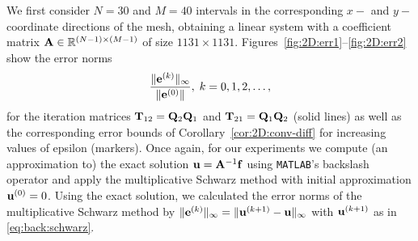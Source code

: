 We first consider $N = 30$ and $M = 40$ intervals in the corresponding $x-$ and
$y-$coordinate directions of the mesh, obtaining a linear system with a coefficient matrix  $\mathbf{A}\in\mathbb{R}^{(N-1)\times(M-1)}$ of size $1131 \times 1131$. Figures~\ref{fig:2D:err1}--\ref{fig:2D:err2} show the error norms
\[
\frac{\|\mathbf{e}^{(k)}\|_\infty}{\|\mathbf{e}^{(0)}\| },\;k=0,1,2,\ldots,
\]
for the iteration matrices $\mathbf{T}_{12}=\mathbf{Q}_2\mathbf{Q}_1$ and $\mathbf{T}_{21}=\mathbf{Q}_1\mathbf{Q}_2$ (solid lines) as well as
the corresponding error bounds of Corollary~\ref{cor:2D:conv-diff} for
increasing values of epsilon (markers). Once again, for our experiments we compute (an approximation to) the exact solution $\mathbf{u}=\mathbf{A}^{-1}\mathbf{f}$ using \texttt{MATLAB}'s backslash operator and apply the multiplicative Schwarz method with initial approximation $\mathbf{u}^{(0)}=0$. Using the exact solution, we calculated the error norms of the multiplicative Schwarz method by
$\|\mathbf{e}^{(k)}\|_\infty=\|\mathbf{u}^{(k+1)}-\mathbf{u}\|_\infty$ with $\mathbf{u}^{(k+1)}$
as in \eqref{eq:back:schwarz}.
%

